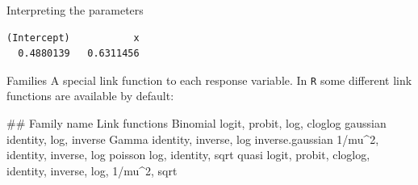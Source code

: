 \documentclass[
  ignorenonframetext,
]{beamer}
\newenvironment{Shaded}{\begin{snugshade}}{\end{snugshade}}
\newcommand{\CommentTok}[1]{\textcolor[rgb]{0.54,0.53,0.53}{#1}}
\newcommand{\DecValTok}[1]{\textcolor[rgb]{0.69,0.50,0.00}{#1}}
\newcommand{\DocumentationTok}[1]{\textcolor[rgb]{0.38,0.47,0.50}{#1}}
\newcommand{\FunctionTok}[1]{\textcolor[rgb]{0.39,0.29,0.61}{#1}}
\newcommand{\NormalTok}[1]{\textcolor[rgb]{0.12,0.11,0.11}{#1}}
\newcommand{\OtherTok}[1]{\textcolor[rgb]{0.00,0.43,0.16}{#1}}
\newcommand{\SpecialCharTok}[1]{\textcolor[rgb]{0.24,0.68,0.91}{#1}}
\begin{document}
\begin{frame}[fragile]{Interpreting the parameters}
\protect\hypertarget{interpreting-the-parameters}{}
\begin{Shaded}
\end{Shaded}

\begin{verbatim}
(Intercept)           x 
  0.4880139   0.6311456 
\end{verbatim}
\end{frame}

\begin{frame}[fragile]{Families}
\protect\hypertarget{families}{}
A special link function to each response variable. In \texttt{R} some
different link functions are available by default:

\begin{Shaded}
\begin{Highlighting}[]
\DocumentationTok{\#\# Family name     Link functions}
\NormalTok{Binomial           logit, probit, log, cloglog}
\NormalTok{gaussian           identity, log, inverse}
\NormalTok{Gamma              identity, inverse, log}
\NormalTok{inverse.gaussian   }\DecValTok{1}\SpecialCharTok{/}\NormalTok{mu}\SpecialCharTok{\^{}}\DecValTok{2}\NormalTok{, identity, inverse, log}
\NormalTok{poisson            log, identity, sqrt}
\NormalTok{quasi              logit, probit, cloglog, identity, inverse, }
\NormalTok{                   log, }\DecValTok{1}\SpecialCharTok{/}\NormalTok{mu}\SpecialCharTok{\^{}}\DecValTok{2}\NormalTok{, sqrt}
\end{Highlighting}
\end{Shaded}
\end{frame}
\end{document}
